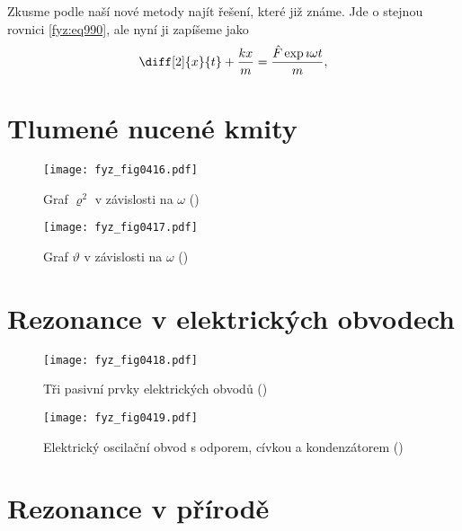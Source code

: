     Zkusme podle naší nové metody najít řešení, které již známe. Jde o stejnou rovnici
    \eqref{fyz:eq990}, ale nyní ji zapíšeme jako
    \begin{equation}\label{fyz:eq996}
      \diff[2]{x}{t}+\frac{kx}{m}=\frac{\hat{F}\exp{\imath\omega t}}{m},
    \end{equation}

  \section{Tlumené nucené kmity}\label{fyz:IchapXXIIIsecII}

    \begin{figure}[ht!] %
      \centering
      \texttt{[image: fyz\_fig0416.pdf]}
      \caption{Graf \(\varrho^2\) v závislosti na \(\omega\)
              (\cite[s.~313]{Feynman01})}
      \label{fyz:fig0416}
    \end{figure}

    \begin{figure}[ht!] %
      \centering
      \texttt{[image: fyz\_fig0417.pdf]}
      \caption{Graf \(\vartheta\) v závislosti na \(\omega\)
               (\cite[s.~314]{Feynman01})}
      \label{fyz:fig0417}
    \end{figure}

  \section{Rezonance v elektrických obvodech}\label{fyz:IchapXXIIIsecIII}

    \begin{figure}[ht!] %
      \centering
      \texttt{[image: fyz\_fig0418.pdf]}
      \caption{Tři pasivní prvky elektrických obvodů
              (\cite[s.~315]{Feynman01})}
      \label{fyz:fig0418}
    \end{figure}

    \begin{figure}[ht!] %
      \centering
      \texttt{[image: fyz\_fig0419.pdf]}
      \caption{Elektrický oscilační obvod s odporem, cívkou a kondenzátorem
               (\cite[s.~316]{Feynman01})}
      \label{fyz:fig0419}
    \end{figure}

  \section{Rezonance v přírodě}\label{fyz:IchapXXIIIsecIV}

